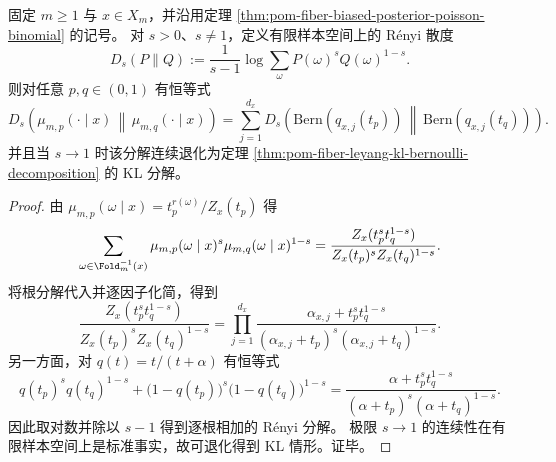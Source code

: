 \begin{theorem}\label{thm:pom-fiber-leyang-renyi-bernoulli-decomposition}
固定 \(m\ge 1\) 与 \(x\in X_m\)，并沿用定理 \ref{thm:pom-fiber-biased-posterior-poisson-binomial} 的记号。
对 \(s>0\)、\(s\neq 1\)，定义有限样本空间上的 R\'enyi 散度
\[
D_s(P\|Q):=\frac{1}{s-1}\log\sum_{\omega}P(\omega)^sQ(\omega)^{1-s}.
\]
则对任意 \(p,q\in(0,1)\) 有恒等式
\[
D_s\!\left(\mu_{m,p}(\cdot\mid x)\,\middle\|\,\mu_{m,q}(\cdot\mid x)\right)
=\sum_{j=1}^{d_x}
D_s\!\left(\mathrm{Bern}(q_{x,j}(t_p))\,\middle\|\,\mathrm{Bern}(q_{x,j}(t_q))\right).
\]
并且当 \(s\to 1\) 时该分解连续退化为定理 \ref{thm:pom-fiber-leyang-kl-bernoulli-decomposition} 的 KL 分解。
\end{theorem}
\begin{proof}
由 \(\mu_{m,p}(\omega\mid x)=t_p^{r(\omega)}/Z_x(t_p)\) 得
\[
\sum_{\omega\in\Fold_m^{-1}(x)}\mu_{m,p}(\omega\mid x)^s\mu_{m,q}(\omega\mid x)^{1-s}
=\frac{Z_x(t_p^s t_q^{1-s})}{Z_x(t_p)^s Z_x(t_q)^{1-s}}.
\]
将根分解代入并逐因子化简，得到
\[
\frac{Z_x(t_p^s t_q^{1-s})}{Z_x(t_p)^s Z_x(t_q)^{1-s}}
=\prod_{j=1}^{d_x}
\frac{\alpha_{x,j}+t_p^s t_q^{1-s}}{(\alpha_{x,j}+t_p)^s(\alpha_{x,j}+t_q)^{1-s}}.
\]
另一方面，对 \(q(t)=t/(t+\alpha)\) 有恒等式
\[
q(t_p)^s q(t_q)^{1-s}+\bigl(1-q(t_p)\bigr)^s\bigl(1-q(t_q)\bigr)^{1-s}
=\frac{\alpha+t_p^s t_q^{1-s}}{(\alpha+t_p)^s(\alpha+t_q)^{1-s}}.
\]
因此取对数并除以 \(s-1\) 得到逐根相加的 R\'enyi 分解。
极限 \(s\to 1\) 的连续性在有限样本空间上是标准事实，故可退化得到 KL 情形。证毕。
\end{proof}

